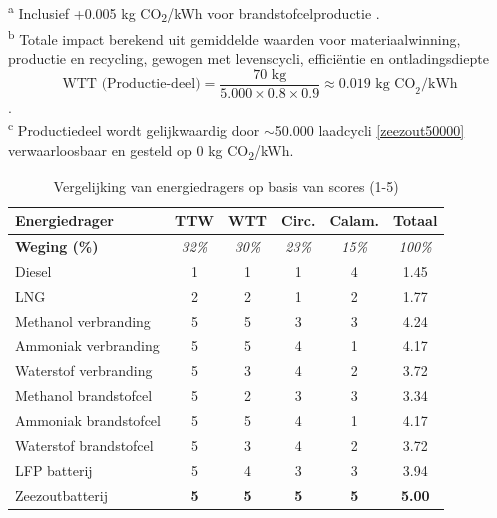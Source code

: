 \begin{table}[h]
\vspace{0.2cm}
\footnotesize
\begin{flushleft}
\textsuperscript{a} Inclusief +0.005 kg CO\textsubscript{2}/kWh voor brandstofcelproductie \cite{Elsevier}.\\
\textsuperscript{b} Totale impact berekend uit gemiddelde waarden voor materiaalwinning, productie en recycling, gewogen met levenscycli, efficiëntie en ontladingsdiepte $$ \text{WTT (Productie-deel)} = \frac{70\text{ kg}}{5.000 \times 0.8 \times 0.9} \approx {0.019\text{ kg CO}_2\text{/kWh}} $$ \cite{GjetaLCA2024}.\\
\textsuperscript{c} Productiedeel wordt gelijkwaardig door $\sim$50.000 laadcycli \ref{zeezout50000} verwaarloosbaar en gesteld op 0 kg CO\textsubscript{2}/kWh.
\end{flushleft}
\end{table}



\begin{table}[h]
\centering
\caption{Vergelijking van energiedragers op basis van scores (1-5)}
\label{tab:scores_energiedragers}
\renewcommand{\arraystretch}{1.2}
\begin{tabular}{lccccc}
\hline
\textbf{Energiedrager} & \textbf{TTW} & \textbf{WTT} & \textbf{Circ.} & \textbf{Calam.} & \textbf{Totaal} \\
\hline
\textbf{Weging (\%)} & \textit{32\%} & \textit{30\%} & \textit{23\%} & \textit{15\%} & \textit{100\%} \\
\hline
Diesel & 1 & 1 & 1 & 4 & 1.45 \\
LNG & 2 & 2 & 1 & 2 & 1.77 \\
Methanol verbranding & 5 & 5 & 3 & 3 & 4.24 \\
Ammoniak verbranding & 5 & 5 & 4 & 1 & 4.17 \\
Waterstof verbranding & 5 & 3 & 4 & 2 & 3.72 \\
Methanol brandstofcel & 5 & 2 & 3 & 3 & 3.34 \\
Ammoniak brandstofcel & 5 & 5 & 4 & 1 & 4.17 \\
Waterstof brandstofcel & 5 & 3 & 4 & 2 & 3.72 \\
LFP batterij & 5 & 4 & 3 & 3 & 3.94 \\
Zeezoutbatterij & \textbf{5} & \textbf{5} & \textbf{5} & \textbf{5} & \textbf{5.00} \\
\hline
\end{tabular}
\end{table}


